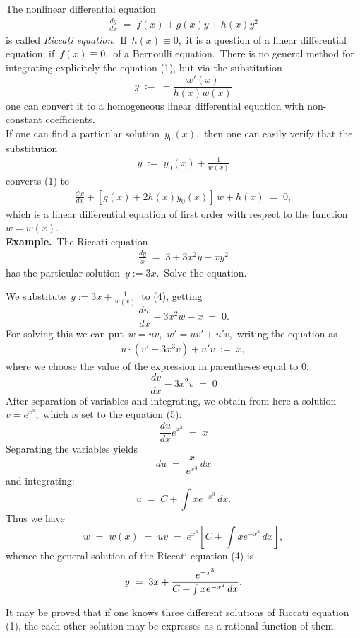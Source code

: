 \documentclass[12pt]{article}
\theoremstyle{definition}
\begin{document}
The nonlinear differential equation
\begin{align}
\frac{dy}{dx} \;=\; f(x)+g(x)y+h(x)y^2
\end{align}
is called {\em Riccati equation}.\, If\, $h(x) \equiv 0$,\, it is a question of a linear differential equation; if\, $f(x) \equiv 0$,\, of a Bernoulli equation.\, There is no general method for integrating explicitely the equation (1), but 
via the substitution
$$y \;:=\; -\frac{w'(x)}{h(x)w(x)}$$
one can convert it to a  homogeneous linear differential equation with non-constant coefficients.\\

If one can find a particular solution \,$y_0(x)$,\, then one can easily verify that the substitution
\begin{align}
y \;:=\; y_0(x)+\frac{1}{w(x)}
\end{align}
converts (1) to
\begin{align}
\frac{dw}{dx}+[g(x)\!+\!2h(x)y_0(x)]\,w+h(x) \;=\; 0,
\end{align}
which is a linear differential equation of first order with respect to the function \,$w =w(x)$.\\

\textbf{Example.}\, The Riccati equation
\begin{align}
\frac{dy}{x} \;=\; 3+3x^2y-xy^2
\end{align}
has the particular solution\, $y := 3x$.\, Solve the equation.

We substitute\, $y := 3x+\frac{1}{w(x)}$\, to (4), getting
$$\frac{dw}{dx}-3x^2w-x \;=\; 0.$$
For solving this  we can put\, $w = uv$,\, $w' = uv'+u'v$,\, writing the equation as
\begin{align}
u\cdot(v'-3x^3v)+u'v \;:=\; x,
\end{align}
where we choose the value of the expression in parentheses equal to 0:
$$\frac{dv}{dx}-3x^2v \;=\; 0$$
After separation of variables and integrating, we obtain from here a solution\, $v = e^{x^3}$,\, which is set to the equation (5):
$$\frac{du}{dx}e^{x^3} \;=\; x$$  
Separating the variables yields
$$du \;=\; \frac{x}{e^{x^3}}\,dx$$
and integrating:
$$u \;=\; C+\int xe^{-x^3}\,dx.$$
Thus we have
$$w \;=\; w(x) \;=\; uv \;=\; e^{x^3}\left[C+\int xe^{-x^3}\,dx\right],$$
whence the general solution of the Riccati equation (4) is
$$\displaystyle y \;=\; 3x+\frac{e^{-x^3}}{C+\int xe^{-x^3}\,dx}.\\$$


It may be proved that if one knows three different solutions of Riccati equation (1), the each other solution may be expresses as a rational function of them.
 
 


\end{document}
